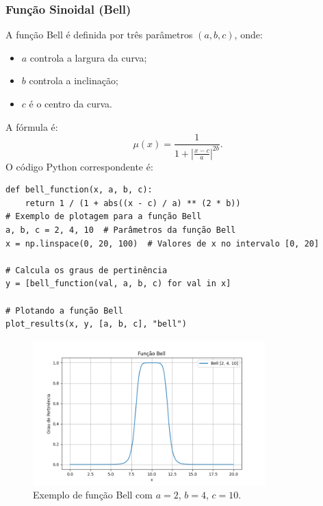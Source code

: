 \documentclass[a4paper,12pt]{article}
\begin{document}
\subsubsection{Função Sinoidal (Bell)}
A função Bell é definida por três parâmetros $(a, b, c)$, onde:
\begin{itemize}
    \item $a$ controla a largura da curva;
    \item $b$ controla a inclinação;
    \item $c$ é o centro da curva.
\end{itemize}
A fórmula é:
\[
\mu(x) = \frac{1}{1 + \left|\frac{x - c}{a}\right|^{2b}}.
\]
O código Python correspondente é:
\begin{verbatim}
def bell_function(x, a, b, c):
    return 1 / (1 + abs((x - c) / a) ** (2 * b))
# Exemplo de plotagem para a função Bell
a, b, c = 2, 4, 10  # Parâmetros da função Bell
x = np.linspace(0, 20, 100)  # Valores de x no intervalo [0, 20]

# Calcula os graus de pertinência
y = [bell_function(val, a, b, c) for val in x]

# Plotando a função Bell
plot_results(x, y, [a, b, c], "bell")

\end{verbatim}
\begin{figure}[H]
    \centering
    \includegraphics[width=0.8\textwidth]{img/bell.png}
    \caption{Exemplo de função Bell com $a=2$, $b=4$, $c=10$.}
\end{figure}
\end{document}
